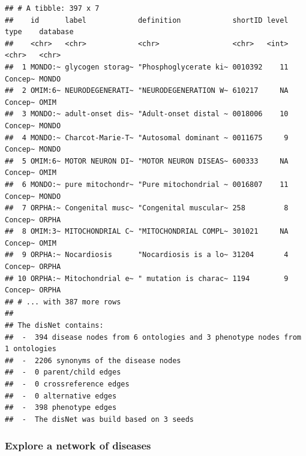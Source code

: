 \documentclass[9pt,a4paper,]{extarticle}
\begin{document}
\begin{verbatim}
## # A tibble: 397 x 7
##    id      label            definition            shortID level type    database
##    <chr>   <chr>            <chr>                 <chr>   <int> <chr>   <chr>   
##  1 MONDO:~ glycogen storag~ "Phosphoglycerate ki~ 0010392    11 Concep~ MONDO   
##  2 OMIM:6~ NEURODEGENERATI~ "NEURODEGENERATION W~ 610217     NA Concep~ OMIM    
##  3 MONDO:~ adult-onset dis~ "Adult-onset distal ~ 0018006    10 Concep~ MONDO   
##  4 MONDO:~ Charcot-Marie-T~ "Autosomal dominant ~ 0011675     9 Concep~ MONDO   
##  5 OMIM:6~ MOTOR NEURON DI~ "MOTOR NEURON DISEAS~ 600333     NA Concep~ OMIM    
##  6 MONDO:~ pure mitochondr~ "Pure mitochondrial ~ 0016807    11 Concep~ MONDO   
##  7 ORPHA:~ Congenital musc~ "Congenital muscular~ 258         8 Concep~ ORPHA   
##  8 OMIM:3~ MITOCHONDRIAL C~ "MITOCHONDRIAL COMPL~ 301021     NA Concep~ OMIM    
##  9 ORPHA:~ Nocardiosis      "Nocardiosis is a lo~ 31204       4 Concep~ ORPHA   
## 10 ORPHA:~ Mitochondrial e~ " mutation is charac~ 1194        9 Concep~ ORPHA   
## # ... with 387 more rows
## 
## The disNet contains:
##  -  394 disease nodes from 6 ontologies and 3 phenotype nodes from 1 ontologies 
##  -  2206 synonyms of the disease nodes
##  -  0 parent/child edges
##  -  0 crossreference edges
##  -  0 alternative edges
##  -  398 phenotype edges
##  -  The disNet was build based on 3 seeds
\end{verbatim}

\hypertarget{explore-a-network-of-diseases}{%
\subsubsection{Explore a network of diseases}\label{explore-a-network-of-diseases}}
\end{document}
